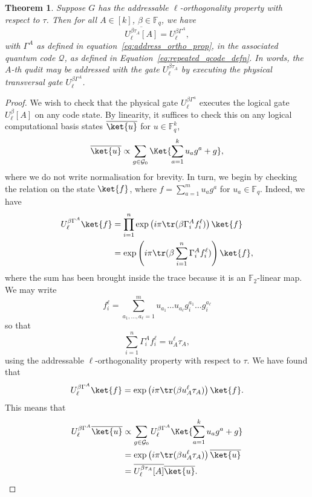 \documentclass[11pt]{article}
\newtheorem{theorem}{Theorem}[section]
\theoremstyle{definition}
\newcommand{\qcode}{\mathcal{Q}}
\newcommand*{\ol}{\overline}
\begin{document}
\begin{theorem}\label{thm:degree_ell_gate}
    Suppose $G$ has the addressable $\ell$-orthogonality property with respect to $\tau$. Then for all $A \in [k]$, $\beta \in \mathbb{F}_q$, we have
    \begin{equation}
        \ol{U_\ell^{\beta\tau_A}[A]} = U_\ell^{\beta\Gamma^A},
    \end{equation}
    with $\Gamma^A$ as defined in equation~\eqref{eq:address_ortho_prop}, in the associated quantum code $\qcode$, as defined in Equation~\eqref{eq:repeated_qcode_defn}. In words, the $A$-th qudit may be addressed with the gate $U_\ell^{\beta\tau_A}$ by executing the physical transversal gate $U_\ell^{\beta\Gamma^A}$.
\end{theorem}
\begin{proof}
    We wish to check that the physical gate $U_\ell^{\beta\Gamma^a}$ executes the logical gate $U_\ell^\beta[A]$ on any code state. By linearity, it suffices to check this on any logical computational basis states $\ol{\ket{u}}$ for $u \in \mathbb{F}_q^k$,
    \begin{equation}\label{eq:qcode_comp_basis_logical}
        \ol{\ket{u}} \propto \sum_{g \in \mathcal{G}_0}\Ket{\sum_{a=1}^ku_ag^a+g},
    \end{equation}
    where we do not write normalisation for brevity.
    In turn, we begin by checking the relation on the state $\ket{f}$, where $f = \sum_{a=1}^mu_ag^a$ for $u_a \in \mathbb{F}_q$. Indeed, we have
    \begin{align}
        U_\ell^{\beta\Gamma^A}\ket{f} &= \prod_{i=1}^n\exp\left(i\pi\tr(\beta\Gamma_i^Af_i^\ell)\right)\ket{f}\\
        &=\exp\left(i\pi\tr(\beta\sum_{i=1}^n\Gamma_i^Af_i^\ell)\right)\ket{f},
    \end{align}
    where the sum has been brought inside the trace because it is an $\mathbb{F}_2$-linear map.
    We may write
    \begin{equation}
        f_i^\ell = \sum_{a_1, \ldots, a_\ell=1}^mu_{a_1}\ldots u_{a_\ell}g_i^{a_1}\ldots g_i^{a_\ell}
    \end{equation}
    so that
    \begin{equation}
        \sum_{i=1}^n\Gamma_i^Af_i^\ell = u_A^\ell\tau_A,
    \end{equation}
    using the addressable $\ell$-orthogonality property with respect to $\tau$. We have found that
    \begin{equation}
        U_\ell^{\beta\Gamma^A}\ket{f} = \exp\left(i\pi\tr(\beta u_A^\ell\tau_A)\right)\ket{f}.
    \end{equation}
    This means that
    \begin{align}
        U_\ell^{\beta\Gamma^A}\ol{\ket{u}}&\propto \sum_{g \in \mathcal{G}_0}U_\ell^{\beta\Gamma^A}\Ket{\sum_{a=1}^ku_ag^a+g}\\
        &=\exp\left(i\pi\tr(\beta u_A^\ell\tau_A)\right)\ol{\ket{u}}\\
        &=\ol{U_\ell^{\beta\tau_A}[A]}\ol{\ket{u}}. \qedhere
    \end{align}
\end{proof}
\end{document}
